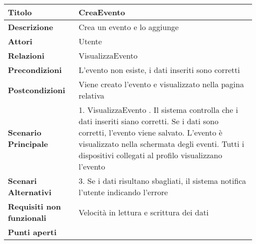 \begin{tabular} {|P{4.5cm}|P{11cm}|}
  \hline
  \textbf{Titolo}                   & CreaEvento                                                                        \\
  \hline
  \textbf{Descrizione}              & Crea un evento e lo aggiunge                                                      \\
  \hline
  \textbf{Attori}                   & Utente                                                                            \\
  \hline
  \textbf{Relazioni}                & VisualizzaEvento                                                                  \\
  \hline
  \textbf{Precondizioni}            & L'evento non esiste, i dati inseriti sono corretti                                \\
  \hline
  \textbf{Postcondizioni}           & Viene creato l'evento e visualizzato nella pagina relativa                        \\
  \hline
  \textbf{Scenario Principale}      & 1. VisualizzaEvento . Il sistema controlla che i dati inseriti siano corretti. Se i dati sono corretti, l'evento viene salvato. L'evento è visualizzato nella schermata degli eventi. Tutti i dispositivi collegati al profilo visualizzano l'evento                                                     \\
  \hline
  \textbf{Scenari Alternativi}      & 3. Se i dati risultano sbagliati, il sistema notifica l'utente indicando l'errore \\
  \hline
  \textbf{Requisiti non funzionali} & Velocità in lettura e scrittura dei dati                                          \\
  \hline
  \textbf{Punti aperti}             &                                                                                   \\
  \hline
\end{tabular}
\hfill
\break

